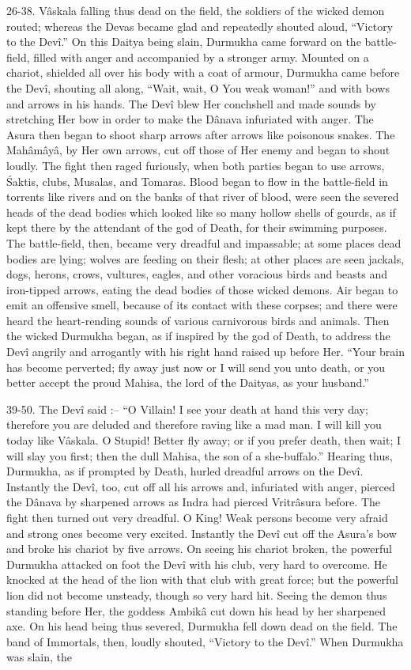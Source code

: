 26-38. V\^askala falling thus dead on the field, the soldiers of the wicked demon routed; whereas the Devas became glad and repeatedly shouted aloud, ``Victory to the Dev\^i.'' On this Daitya being slain, Durmukha came forward on the battle-field, filled with anger and accompanied by a stronger army. Mounted on a chariot, shielded all over his body with a coat of armour, Durmukha came before the Dev\^i, shouting all along, ``Wait, wait, O You weak woman!'' and with bows and arrows in his hands. The Dev\^i blew Her conchshell and made sounds by stretching Her bow in order to make the D\^anava infuriated with anger. The Asura then began to shoot sharp arrows after arrows like poisonous snakes. The Mah\^am\^ay\^a, by Her own arrows, cut off those of Her enemy and began to shout loudly. The fight then raged furiously, when both parties began to use arrows, \'Saktis, clubs, Musalas, and Tomaras. Blood began to flow in the battle-field in torrents like rivers and on the banks of that river of blood, were seen the severed heads of the dead bodies which looked like so many hollow shells of gourds, as if kept there by the attendant of the god of Death, for their swimming purposes. The battle-field, then, became very dreadful and impassable; at some places dead bodies are lying; wolves are feeding on their flesh; at other places are seen jackals, dogs, herons, crows, vultures, eagles, and other voracious birds and beasts and iron-tipped arrows, eating the dead bodies of those wicked demons. Air began to emit an offensive smell, because of its contact with these corpses; and there were heard the heart-rending sounds of various carnivorous birds and animals. Then the wicked Durmukha began, as if inspired by the god of Death, to address the Dev\^i angrily and arrogantly with his right hand raised up before Her. ``Your brain has become perverted; fly away just now or I will send you unto death, or you better accept the proud Mahisa, the lord of the Daityas, as your husband.''

39-50. The Dev\^i said :-- ``O Villain! I see your death at hand this very day; therefore you are deluded and therefore raving like a mad man. I will kill you today like V\^askala. O Stupid! Better fly away; or if you prefer death, then wait; I will slay you first; then the dull Mahisa, the son of a she-buffalo.'' Hearing thus, Durmukha, as if prompted by Death, hurled dreadful arrows on the Dev\^i. Instantly the Dev\^i, too, cut off all his arrows and, infuriated with anger, pierced the D\^anava by sharpened arrows as Indra had pierced Vritr\^asura before. The fight then turned out very dreadful. O King! Weak persons become very afraid and strong ones become very excited. Instantly the Dev\^i cut off the Asura's bow and broke his chariot by five arrows. On seeing his chariot broken, the powerful Durmukha attacked on foot the Dev\^i with his club, very hard to overcome. He knocked at the head of the lion with that club with great force; but the powerful lion did not become unsteady, though so very hard hit. Seeing the demon thus standing before Her, the goddess Ambik\^a cut down his head by her sharpened axe. On his head being thus severed, Durmukha fell down dead on the field. The band of Immortals, then, loudly shouted, ``Victory to the Dev\^i.'' When Durmukha was slain, the

